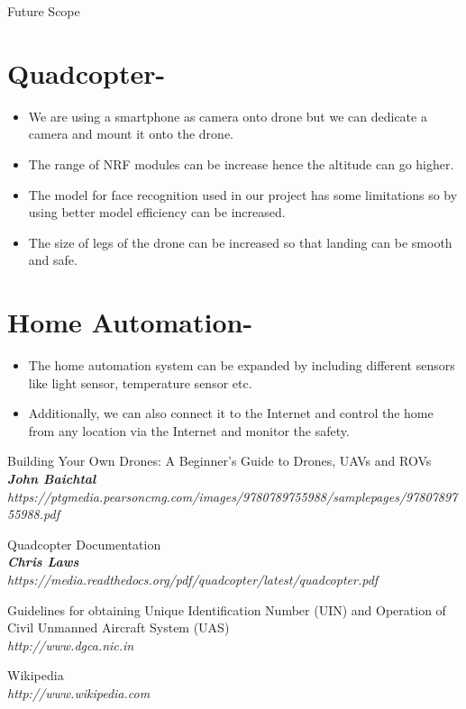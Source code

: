 \documentclass[12pt, oneside]{report}
\numberwithin{equation}{section}
\begin{document}
\begin{chapter}{Future Scope}
 
\section{Quadcopter-}
\begin{itemize}
\item We are using a smartphone as camera onto drone but we can dedicate a camera and mount it onto the drone.
\item The range of NRF modules can be increase hence the altitude can go higher.
\item The model for face recognition used in our project has some limitations so by using better model efficiency can be increased.
\item The size of legs of the drone can be increased so that landing can be smooth and safe.
\end{itemize}

\section{Home Automation-}
\begin{itemize}
\item The home automation system can be expanded by including different sensors like light sensor, temperature sensor etc.
\item Additionally, we can also connect it to the Internet and control the home from any location via the Internet and monitor the safety.
\end{itemize}
  
\end{chapter}

\begin{thebibliography}{15}
Building Your Own Drones: A Beginner's Guide to Drones, UAVs and ROVs
\\\textbf{\textit{John Baichtal}}
\\\textit{https://ptgmedia.pearsoncmg.com/images/9780789755988/samplepages/9780789755988.pdf}

Quadcopter Documentation
\\\textbf{\textit{Chris Laws}}
\\\textit{https://media.readthedocs.org/pdf/quadcopter/latest/quadcopter.pdf}

Guidelines for obtaining Unique Identification Number (UIN) and Operation of Civil Unmanned Aircraft System (UAS)
\\\textit{http://www.dgca.nic.in}

Wikipedia
\\\textit{http://www.wikipedia.com}



\end{thebibliography}
\end{document}
